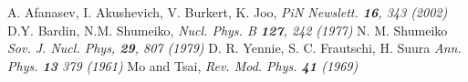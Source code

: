 \begin{thebibliography}{mybib}
	   {A. Afanasev, I. Akushevich, V. Burkert, K. Joo},       {\it PiN Newslett.  {\bf 16}, 343 (2002)}
	  {D.Y. Bardin, N.M. Shumeiko},                           {\it Nucl. Phys. B {\bf 127}, 242 (1977)}
	      {N. M. Shumeiko}                                        {\it Sov. J. Nucl. Phys, {\bf 29}, 807 (1979)}
	       {D. R. Yennie, S. C. Frautschi, H. Suura}               {\it Ann. Phys. {\bf 13} 379 (1961)}
	    {Mo and Tsai},                                          {\it Rev. Mod. Phys. {\bf 41} (1969)}
\end{thebibliography}
